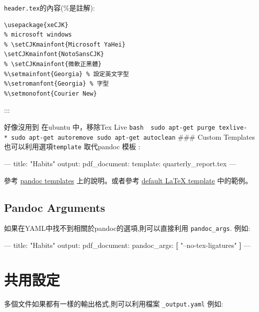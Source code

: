 \documentclass[]{book}
\newenvironment{Shaded}{\begin{snugshade}}{\end{snugshade}}
\newcommand{\KeywordTok}[1]{\textcolor[rgb]{0.13,0.29,0.53}{\textbf{#1}}}
\newcommand{\StringTok}[1]{\textcolor[rgb]{0.31,0.60,0.02}{#1}}
\newcommand{\OtherTok}[1]{\textcolor[rgb]{0.56,0.35,0.01}{#1}}
\newcommand{\FunctionTok}[1]{\textcolor[rgb]{0.00,0.00,0.00}{#1}}
\newcommand{\AttributeTok}[1]{\textcolor[rgb]{0.77,0.63,0.00}{#1}}
\theoremstyle{definition}
\theoremstyle{definition}
\theoremstyle{definition}
\theoremstyle{remark}
\begin{document}
\texttt{header.tex}的內容(\%是註解):

\begin{verbatim}
\usepackage{xeCJK}
% microsoft windows
% \setCJKmainfont{Microsoft YaHei}
\setCJKmainfont{NotoSansCJK}
% \setCJKmainfont{微軟正黑體}
%\setmainfont{Georgia} % 設定英文字型
%\setromanfont{Georgia} % 字型
%\setmonofont{Courier New}
\end{verbatim}

:::

好像沒用到 在ubuntu 中，移除Tex Live
\texttt{bash\ \ sudo\ apt-get\ purge\ texlive-*\ sudo\ apt-get\ autoremove\ sudo\ apt-get\ autoclean}
\#\#\# Custom Templates 也可以利用選項\texttt{template} 取代pandoc 模板
:

\begin{Shaded}
\begin{Highlighting}[]
\OtherTok{---}
\FunctionTok{title:}\AttributeTok{ }\StringTok{"Habits"}
\FunctionTok{output:}
  \FunctionTok{pdf_document:}
    \FunctionTok{template:}\AttributeTok{ quarterly_report.tex}
\OtherTok{---}
\end{Highlighting}
\end{Shaded}

參考 \href{http://pandoc.org/README.html\#templates}{pandoc templates}
上的說明。或者參考
\href{https://github.com/jgm/pandoc-templates/blob/master/default.latex}{default
LaTeX template} 中的範例。

\subsection{Pandoc Arguments}\label{pandoc-arguments}

如果在YAML中找不到相關於pandoc的選項,則可以直接利用
\texttt{pandoc\_args}. 例如:

\begin{Shaded}
\begin{Highlighting}[]
\OtherTok{---}
\FunctionTok{title:}\AttributeTok{ }\StringTok{"Habits"}
\FunctionTok{output:}
  \FunctionTok{pdf_document:}
    \FunctionTok{pandoc_args:}\AttributeTok{ }\KeywordTok{[}
      \StringTok{"--no-tex-ligatures"}
    \KeywordTok{]}
\OtherTok{---}
\end{Highlighting}
\end{Shaded}

\section{共用設定}

多個文件如果都有一樣的輸出格式,則可以利用檔案 \texttt{\_output.yaml}
例如:
\end{document}
